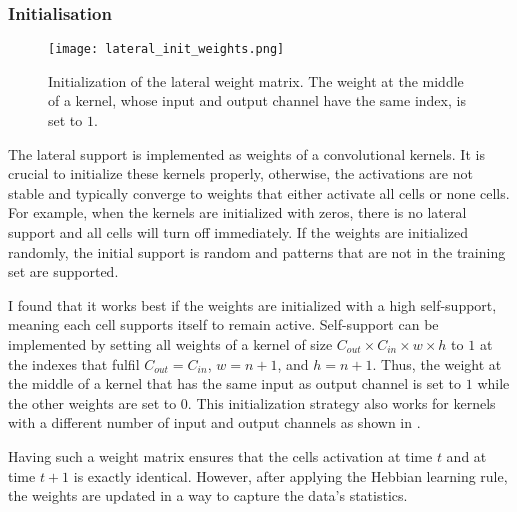 \subsubsection{Initialisation}
\begin{figure}[h]
    \centering
    \texttt{[image: lateral\_init\_weights.png]}
    \caption[Initialization of the lateral weight matrix]{Initialization of the lateral weight matrix. The weight at the middle of a kernel, whose input and output channel have the same index, is set to $1$.}
\end{figure}
The lateral support is implemented as weights of a convolutional kernels.
It is crucial to initialize these kernels properly, otherwise, the activations are not stable and typically converge to weights that either activate all cells or none cells.
For example, when the kernels are initialized with zeros, there is no lateral support and all cells will turn off immediately.
If the weights are initialized randomly, the initial support is random and patterns that are not in the training set  are supported.

I found that it works best if the weights are initialized with a high self-support, meaning each cell supports itself to remain active.
Self-support can be implemented by setting all weights of a kernel of size $C_{out} \times C_{in} \times w \times h$ to $1$ at the indexes that fulfil 
$C_{out} = C_{in}$, $w = n+1$, and $h = n+1$. Thus, the weight at the middle of a kernel that has the same input as output channel is set to $1$ while the other weights are set to $0$. This initialization strategy also works for kernels with a different number of input and output channels as shown in .

Having such a weight matrix ensures that the cells activation at time $t$ and at time $t+1$ is exactly identical. However, after applying the Hebbian learning rule, the weights are updated in a way to capture the data's statistics.


